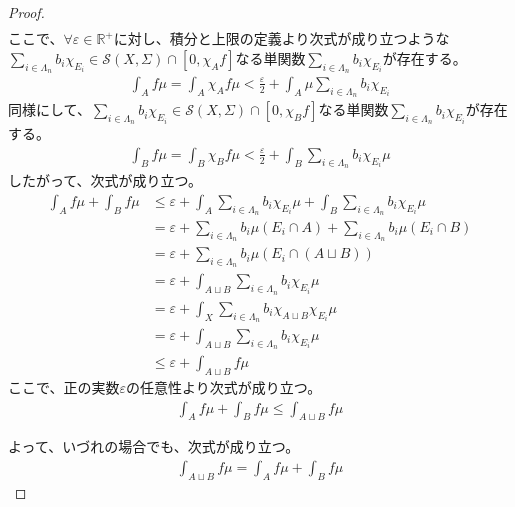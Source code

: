 \documentclass[dvipdfmx]{jsarticle}
\begin{document}
\begin{proof}
\begin{align*}
\end{align*}
ここで、$\forall\varepsilon \in \mathbb{R}^{+}$に対し、積分と上限の定義より次式が成り立つような$\sum_{i \in \varLambda_{n}} {b_{i}\chi_{E_{i}}}\in \mathcal{S}(X,\varSigma) \cap \left[ 0,\chi_{A}f \right]$なる単関数$\sum_{i \in \varLambda_{n}} {b_{i}\chi_{E_{i}}}$が存在する。
\begin{align*}
\int_{A} {f\mu} = \int_{A} {\chi_{A}f\mu} < \frac{\varepsilon}{2} + \int_{A} {\mu\sum_{i \in \varLambda_{n}} {b_{i}\chi_{E_{i}}}}
\end{align*}
同様にして、$\sum_{i \in \varLambda_{n}} {b_{i}\chi_{E_{i}}}\in \mathcal{S}(X,\varSigma) \cap \left[ 0,\chi_{B}f \right]$なる単関数$\sum_{i \in \varLambda_{n}} {b_{i}\chi_{E_{i}}}$が存在する。
\begin{align*}
\int_{B} {f\mu} = \int_{B} {\chi_{B}f\mu} < \frac{\varepsilon}{2} + \int_{B} {\sum_{i \in \varLambda_{n}} {b_{i}\chi_{E_{i}}}\mu}
\end{align*}
したがって、次式が成り立つ。
\begin{align*}
\int_{A} {f\mu} + \int_{B} {f\mu} &\leq \varepsilon + \int_{A} {\sum_{i \in \varLambda_{n}} {b_{i}\chi_{E_{i}}}\mu} + \int_{B} {\sum_{i \in \varLambda_{n}} {b_{i}\chi_{E_{i}}}\mu}\\
&= \varepsilon + \sum_{i \in \varLambda_{n}} {b_{i}\mu\left( E_{i} \cap A \right)} + \sum_{i \in \varLambda_{n}} {b_{i}\mu\left( E_{i} \cap B \right)}\\
&= \varepsilon + \sum_{i \in \varLambda_{n}} {b_{i}\mu\left( E_{i} \cap (A \sqcup B) \right)}\\
&= \varepsilon + \int_{A \sqcup B} {\sum_{i \in \varLambda_{n}} {b_{i}\chi_{E_{i}}}\mu}\\
&= \varepsilon + \int_{X} {\sum_{i \in \varLambda_{n}} {b_{i}\chi_{A \sqcup B}\chi_{E_{i}}}\mu}\\
&= \varepsilon + \int_{A \sqcup B} {\sum_{i \in \varLambda_{n}} {b_{i}\chi_{E_{i}}}\mu}\\
&\leq \varepsilon + \int_{A \sqcup B} {f\mu}
\end{align*}
ここで、正の実数$\varepsilon$の任意性より次式が成り立つ。
\begin{align*}
\int_{A} {f\mu} + \int_{B} {f\mu} \leq \int_{A \sqcup B} {f\mu}
\end{align*}\par
よって、いづれの場合でも、次式が成り立つ。
\begin{align*}
\int_{A \sqcup B} {f\mu} = \int_{A} {f\mu} + \int_{B} {f\mu}
\end{align*}
\end{proof}
\end{document}
